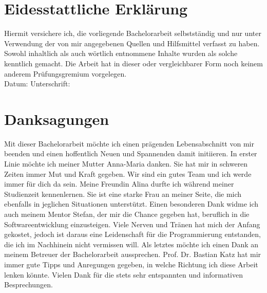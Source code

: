 \setcounter{secnumdepth}{0}
\section{Eidesstattliche Erklärung}

Hiermit versichere ich, die vorliegende Bachelorarbeit selbstständig und nur unter Verwendung der von mir angegebenen Quellen und Hilfsmittel verfasst zu haben. Sowohl inhaltlich als auch wörtlich entnommene Inhalte wurden als solche kenntlich gemacht. Die Arbeit hat in dieser oder vergleichbarer Form noch keinem anderem Prüfungsgremium vorgelegen.
\\[1.5cm]
Datum:	\hrulefill\enspace Unterschrift: \hrulefill


\newpage

\section{Danksagungen}
Mit dieser Bachelorarbeit möchte ich einen prägenden Lebensabschnitt von mir beenden und einen hoffentlich Neuen und Spannenden damit initiieren. In erster Linie möchte ich meiner Mutter Anna-Maria danken. Sie hat mir in schweren Zeiten immer Mut und Kraft gegeben. Wir sind ein gutes Team und ich werde immer für dich da sein. Meine Freundin Alina durfte ich während meiner Studienzeit kennenlernen. Sie ist eine starke Frau an meiner Seite, die mich ebenfalls in jeglichen Situationen unterstützt. Einen besonderen Dank widme ich auch meinem Mentor Stefan, der mir die Chance gegeben hat, beruflich in die Softwareentwicklung einzusteigen. Viele Nerven und Tränen hat mich der Anfang gekostet, jedoch ist daraus eine Leidenschaft für die Programmierung entstanden, die ich im Nachhinein nicht vermissen will. Als letztes möchte ich einen Dank an meinem Betreuer der Bachelorarbeit aussprechen. Prof. Dr. Bastian Katz hat mir immer gute Tipps und Anregungen gegeben, in welche Richtung ich diese Arbeit lenken könnte. Vielen Dank für die stets sehr entspannten und informativen Besprechungen.
